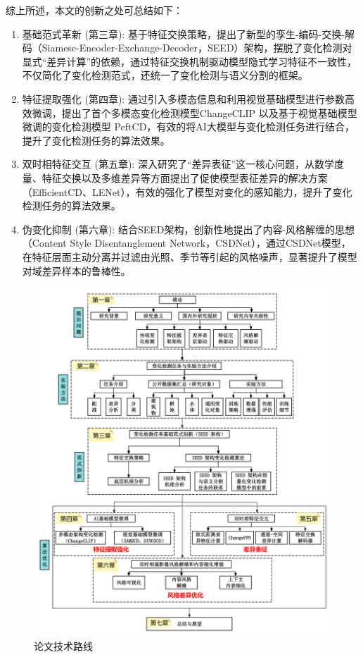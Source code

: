 综上所述，本文的创新之处可总结如下：
\begin{enumerate}[label=(\arabic*)]
  \item  基础范式革新 (第三章): 基于特征交换策略，提出了新型的孪生-编码-交换-解码（Siamese-Encoder-Exchange-Decoder，SEED）架构，摆脱了变化检测对显式“差异计算”的依赖，通过特征交换机制驱动模型隐式学习特征不一致性，不仅简化了变化检测范式，还统一了变化检测与语义分割的框架。

  \item  特征提取强化 (第四章): 通过引入多模态信息和利用视觉基础模型进行参数高效微调，提出了首个多模态变化检测模型ChangeCLIP 以及基于视觉基础模型微调的变化检测模型 PeftCD，有效的将AI大模型与变化检测任务进行结合，提升了变化检测任务的算法效果。

  \item  双时相特征交互 (第五章): 深入研究了“差异表征”这一核心问题，从数学度量、特征交换以及多维差异等方面提出了促使模型表征差异的解决方案（EfficientCD、LENet），有效的强化了模型对变化的感知能力，提升了变化检测任务的算法效果。

  \item  伪变化抑制 (第六章): 结合SEED架构，创新性地提出了内容-风格解缠的思想（Content Style Disentanglement Network，CSDNet），通过CSDNet模型，在特征层面主动分离并过滤由光照、季节等引起的风格噪声，显著提升了模型对域差异样本的鲁棒性。
\end{enumerate}

\begin{figure}[!htbp]
  \centering
  \includegraphics[width=\textwidth]{paper_figures/绪论/论文章节技术路线图.png}
  \caption{论文技术路线}
  \label{fig:paper_overall}
\end{figure}

